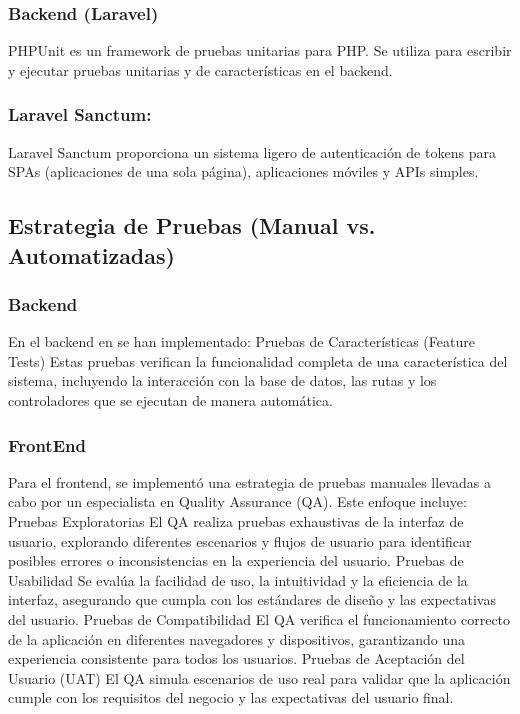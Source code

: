 \documentclass[12pt,letterpaper]{article}
\begin{document}
    \subsubsection{Backend (Laravel)}
    PHPUnit es un framework de pruebas unitarias para PHP. Se utiliza para escribir y ejecutar pruebas unitarias y de características en el backend.

    \subsubsection{Laravel Sanctum:}
    Laravel Sanctum proporciona un sistema ligero de autenticación de tokens para SPAs (aplicaciones de una sola página), aplicaciones móviles y APIs simples.

\subsection{Estrategia de Pruebas (Manual vs. Automatizadas)}
\subsubsection{Backend}
    En el backend en se han implementado:
    Pruebas de Características (Feature Tests)
    Estas pruebas verifican la funcionalidad completa de una característica del sistema, incluyendo la interacción con la base de datos, las rutas y los controladores que se ejecutan de manera automática.

\subsubsection{FrontEnd}
    Para el frontend, se implementó una estrategia de pruebas manuales llevadas a cabo por un especialista en Quality Assurance (QA). Este enfoque incluye:
    Pruebas Exploratorias
    El QA realiza pruebas exhaustivas de la interfaz de usuario, explorando diferentes escenarios y flujos de usuario para identificar posibles errores o inconsistencias en la experiencia del usuario.
    Pruebas de Usabilidad
    Se evalúa la facilidad de uso, la intuitividad y la eficiencia de la interfaz, asegurando que cumpla con los estándares de diseño y las expectativas del usuario.
    Pruebas de Compatibilidad
    El QA verifica el funcionamiento correcto de la aplicación en diferentes navegadores y dispositivos, garantizando una experiencia consistente para todos los usuarios.
    Pruebas de Aceptación del Usuario (UAT)
    El QA simula escenarios de uso real para validar que la aplicación cumple con los requisitos del negocio y las expectativas del usuario final.
\end{document}
